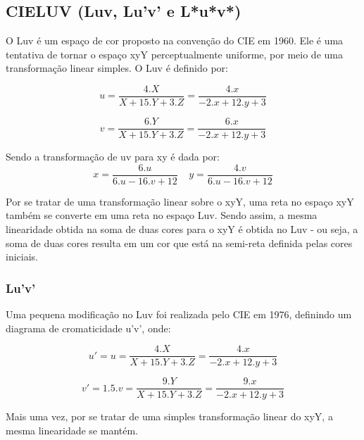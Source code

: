 \documentclass[a4paper,10pt]{report}
\begin{document}
\subsection{CIELUV (Luv, Lu'v' e L*u*v*)}
\par
O Luv é um espaço de cor proposto na convenção do CIE em 1960. Ele é uma
tentativa de tornar o espaço xyY perceptualmente uniforme, por meio de uma
transformação linear simples. O Luv é definido por:

\begin{equation}\label{eq:Luv_u}
u=\frac{4.X}{X+15.Y+3.Z}=\frac{4.x}{-2.x+12.y+3}
\end{equation}

\begin{equation}\label{eq:Luv_v}
v=\frac{6.Y}{X+15.Y+3.Z}=\frac{6.x}{-2.x+12.y+3}
\end{equation}

\par
Sendo a transformação de uv para xy é dada por:
\begin{equation}\label{eq:Luv_xy}
x=\frac{6.u}{6.u-16.v+12}\;\;\;\; y=\frac{4.v}{6.u-16.v+12}
\end{equation}

\par
Por se tratar de uma transformação linear sobre o xyY, uma reta no espaço xyY 
também se converte em uma reta no espaço Luv. Sendo assim, a mesma linearidade
obtida na soma de duas cores para o xyY é obtida no Luv - ou seja, a soma de
duas cores resulta em um cor que está na semi-reta definida pelas cores
iniciais.

\subsubsection{Lu'v'}
\par
Uma pequena modificação no Luv foi realizada pelo CIE em 1976, definindo um
diagrama de cromaticidade u'v', onde: 

\begin{equation}\label{eq:Lu'v'_u'}
u'=u=\frac{4.X}{X+15.Y+3.Z}=\frac{4.x}{-2.x+12.y+3}
\end{equation}

\begin{equation}\label{eq:Lu'v'_v'}
v'=1.5.v=\frac{9.Y}{X+15.Y+3.Z}=\frac{9.x}{-2.x+12.y+3}
\end{equation}

\par
Mais uma vez, por se tratar de uma simples transformação linear do xyY, a mesma
linearidade se mantém.
\end{document}
